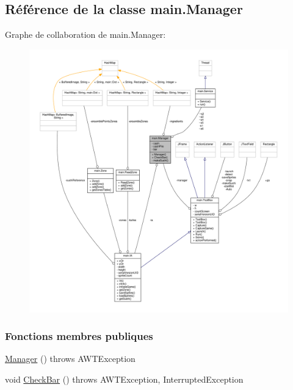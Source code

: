 \hypertarget{classmain_1_1Manager}{}\subsection{Référence de la classe main.\+Manager}
\label{classmain_1_1Manager}


Graphe de collaboration de main.\+Manager\+:\nopagebreak
\begin{figure}[H]
\begin{center}
\leavevmode
\includegraphics[width=350pt]{classmain_1_1Manager__coll__graph}
\end{center}
\end{figure}
\subsubsection*{Fonctions membres publiques}
\begin{DoxyCompactItemize}
\item 
\hyperlink{classmain_1_1Manager_ae258b5aecf0ef1f62a2f2e50a93fd7e6}{Manager} ()  throws A\+W\+T\+Exception 
\item 
void \hyperlink{classmain_1_1Manager_a09b65c1d252dfc883dc45c4e20460f3f}{Check\+Bar} ()  throws A\+W\+T\+Exception, Interrupted\+Exception 
\end{DoxyCompactItemize}
